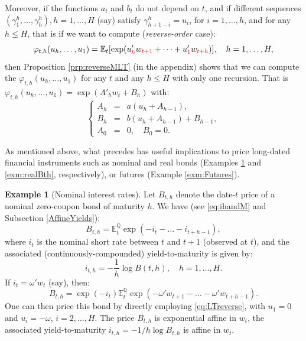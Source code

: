 \documentclass[
  12pt,
]{book}
\theoremstyle{definition}
\theoremstyle{definition}
\newtheorem{example}{Example}[chapter]
\theoremstyle{definition}
\theoremstyle{definition}
\theoremstyle{remark}
\begin{document}
Moreover, if the functions \(a_{t}\) and \(b_{t}\) do not depend on \(t\), and if different sequences \((\gamma^h_1,\dots,\gamma^h_h), h=1,\dots,H\) (say) satisfy \(\gamma^h_{h+1-i} = u_i\), for
\(i=1,\dots,h\), and for any \(h \leq H\), that is if we want to compute (\emph{reverse-order} case):
\begin{equation}
\varphi_{t,h}(u_h,\dots,u_1)=\mathbb{E}_t[\exp(u'_{{\color{red}h}} w_{{\color{red}t+1}}+\dots+u'_{{\color{red}1}} w_{{\color{red}t+h}})],
\quad h=1,\dots,H,\label{eq:LTreverse}
\end{equation}
then Proposition \ref{prp:reverseMLT} (in the appendix) shows that we can compute the \(\varphi_{t,h}(u_h,\dots,u_1)\) for any \(t\) and any \(h \leq H\) with only one recursion. That is \(\varphi_{t,h}(u_h,\dots,u_1)=\exp(A'_hw_t+B_h)\) with:
\begin{equation*}
\left\{
\begin{array}{ccl}
A_{h} &=& a(u_{h} + A_{h-1}), \\
B_{h} &=& b(u_{h} + A_{h-1}) + B_{h-1}, \\
A_{0} &=& 0,\quad  B_{0} = 0.
\end{array}
\right.
\end{equation*}

As mentioned above, what precedes has useful implications to price long-dated financial instruments such as nominal and real bonds (Examples \ref{exm:nominalBth} and \ref{exm:realBth}, respectively), or futures (Example \ref{exm:Futures}).

\begin{example}[Nominal interest rates]
\protect\hypertarget{exm:nominalBth}{}\label{exm:nominalBth}Let \(B_{t,h}\) denote the date-\(t\) price of a nominal zero-coupon bond of maturity \(h\). We have (see \eqref{eq:ihandM} and Subsection \ref{AffineYields}):
\begin{equation}
B_{t,h} = \mathbb{E}^{\mathbb{Q}}_t \exp (-i_{t}-\dots-i_{t+h-1}),\label{eq:stdbond}
\end{equation}
where \(i_{t}\) is the nominal short rate between \(t\) and \(t+1\) (observed at \(t\)), and the associated (continuously-compounded) yield-to-maturity is given by:
\begin{equation}
i_{t,h} = -  \frac{1}{h}   \log   B(t,h), \quad   h=1,\dots,H.
\end{equation}
If \(i_t = \omega'w_t\) (say), then:
\[
B_{t,h} = \exp(-i_{t}) \mathbb{E}^{\mathbb{Q}}_t \exp(-\omega' w_{t+1} - \dots - \omega' w_{t+h-1}).
\]
One can then price this bond by directly employing \eqref{eq:LTreverse}, with \(u_1 = 0\) and \(u_i = - \omega\), \(i = 2,\dots, H\).
The price \(B_{t,h}\) is exponential affine in \(w_t\), the associated yield-to-maturity \(i_{t,h}=-1/h\log B_{t,h}\) is affine in \(w_t\).
\end{example}
\end{document}
